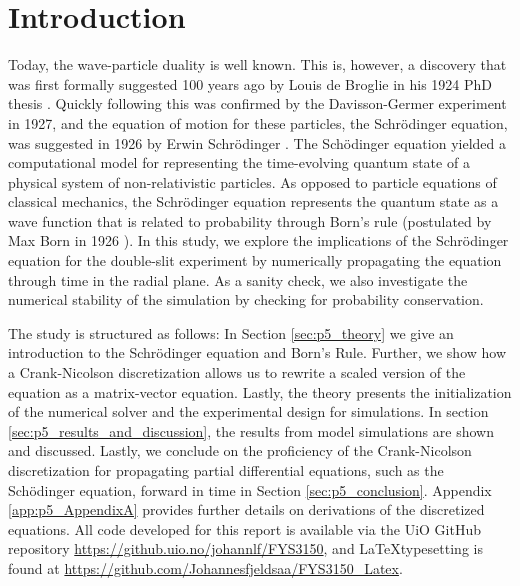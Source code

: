 \documentclass[../main_proj5.tex]{subfiles}
\begin{document}
\section{Introduction}\label{sec:p5_Introduction}

Today, the wave-particle duality is well known. This is, however, a discovery that was first formally suggested 100 years ago by Louis de Broglie in his 1924 PhD thesis \cite{nolte100YearsQuantum2024}. Quickly following this was confirmed by the Davisson-Germer experiment in 1927, and the equation of motion for these particles, the Schr\"odinger equation, was suggested in 1926 by Erwin Schr\"odinger \cite{townsend2010quantum}. The Sch\"odinger equation yielded a computational model for representing the time-evolving quantum state of a physical system of non-relativistic particles. As opposed to particle equations of classical mechanics, the Schr\"odinger equation represents the quantum state as a wave function that is related to probability through Born's rule (postulated by Max Born in 1926 )\cite{prosjekttbeskrivelse5}. In this study, we explore the implications of the Schr\"odinger equation for the double-slit experiment by numerically propagating the equation through time in the radial plane. As a sanity check, we also investigate the numerical stability of the simulation by checking for probability conservation.

The study is structured as follows: In Section \ref{sec:p5_theory} we give an introduction to the Schr\"odinger equation and Born's Rule. Further, we show how a Crank-Nicolson discretization allows us to rewrite a scaled version of the equation as a matrix-vector equation. Lastly, the theory presents the initialization of the numerical solver and the experimental design for simulations. In section \ref{sec:p5_results_and_discussion}, the results from model simulations are shown and discussed. Lastly, we conclude on the proficiency of the Crank-Nicolson discretization for propagating partial differential equations, such as the Sch\"odinger equation, forward in time in Section \ref{sec:p5_conclusion}. Appendix \ref{app:p5_AppendixA} provides further details on derivations of the discretized equations. All code developed for this report is available via the UiO GitHub repository \href{https://github.uio.no/johannlf/FYS3150}{https://github.uio.no/johannlf/FYS3150}, and \LaTeX typesetting is found at \href{https://github.com/Johannesfjeldsaa/FYS3150_Latex}{https://github.com/Johannesfjeldsaa/FYS3150\_Latex}.
\end{document}
